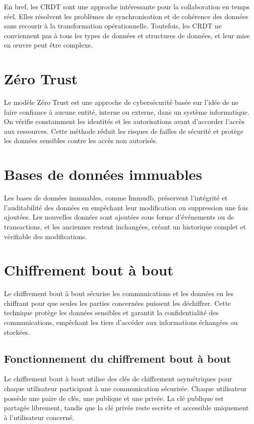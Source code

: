 En bref, les CRDT sont une approche intéressante pour la collaboration en temps réel. Elles résolvent les problèmes de synchronisation et de cohérence des données sans recourir à la transformation opérationnelle. Toutefois, les CRDT ne conviennent pas à tous les types de données et structures de données, et leur mise en œuvre peut être complexe.

\section{Zéro Trust}
Le modèle Zéro Trust est une approche de cybersécurité basée sur l'idée de ne faire confiance à aucune entité, interne ou externe, dans un système informatique. On vérifie constamment les identités et les autorisations avant d'accorder l'accès aux ressources. Cette méthode réduit les risques de failles de sécurité et protège les données sensibles contre les accès non autorisés.

\section{Bases de données immuables}
Les bases de données immuables, comme Immudb\cite{incImmuDB2023}, préservent l'intégrité et l'auditabilité des données en empêchant leur modification ou suppression une fois ajoutées. Les nouvelles données sont ajoutées sous forme d'événements ou de transactions, et les anciennes restent inchangées, créant un historique complet et vérifiable des modifications.

\section{Chiffrement bout à bout}
Le chiffrement bout à bout sécurise les communications et les données en les chiffrant pour que seules les parties concernées puissent les déchiffrer. Cette technique protège les données sensibles et garantit la confidentialité des communications, empêchant les tiers d'accéder aux informations échangées ou stockées.

\subsection{Fonctionnement du chiffrement bout à bout}
Le chiffrement bout à bout utilise des clés de chiffrement asymétriques pour chaque utilisateur participant à une communication sécurisée. Chaque utilisateur possède une paire de clés, une publique et une privée. La clé publique est partagée librement, tandis que la clé privée reste secrète et accessible uniquement à l'utilisateur concerné.

